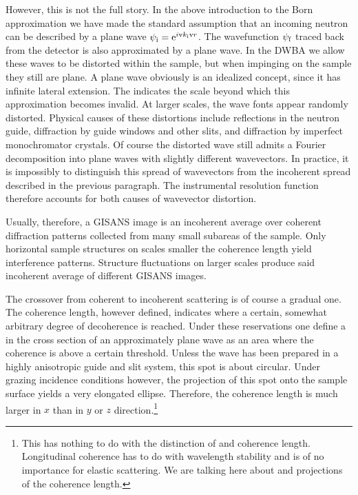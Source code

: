 However, this is not the full story.
In the above introduction to the Born approximation
we have made the standard assumption
that an incoming neutron can be described by a plane wave
$\psi_{\text{i}}=\text{e}^{i\text{v}{k}_{\text{i}}\text{v}{r}}$.
The wavefunction $\psi_{\text{f}}$ traced back from the detector is also
approximated by a plane wave.
In the DWBA we allow these waves to be distorted within the sample,
but when impinging on the sample they still are plane.
A plane wave obviously is an idealized concept,
since it has infinite lateral extension.
The  indicates the scale
beyond which this approximation becomes invalid.
At larger scales, the wave fonts appear randomly distorted.
Physical causes of these distortions include
reflections in the neutron guide,
diffraction by guide windows and other slits,
and diffraction by imperfect monochromator crystals.
Of course the distorted wave still admits a Fourier decomposition
into plane waves with slightly different wavevectors.
In practice, it is impossibly to distinguish this spread of wavevectors
from the incoherent spread described in the previous paragraph.
The instrumental resolution function therefore
accounts for both causes of wavevector distortion.
%

Usually, therefore, a GISANS image is an incoherent average
over coherent diffraction patterns collected from 
many small subareas of the sample.
Only horizontal sample structures on scales smaller the coherence length
yield interference patterns.
Structure fluctuations on larger scales
produce said incoherent average of different GISANS images.

The crossover from coherent to incoherent scattering is of course
a gradual one.
The coherence length, however defined,
indicates where a certain, somewhat arbitrary degree
of decoherence is reached.
Under these reservations
one define a 
in the cross section of an approximately plane wave
as an area where the coherence is above a certain threshold.
Unless the wave has been prepared in a highly anisotropic guide and slit system,
this spot is about circular.
Under grazing incidence conditions however,
the projection of this spot onto the sample surface
yields a very elongated ellipse.
Therefore, the coherence length is much larger in $x$ than
in $y$ or $z$ direction.\footnote
{This has nothing to do with the distinction of
   and  coherence length.
  Longitudinal coherence has to do with wavelength stability
  and is of no importance for elastic scattering.
  We are talking here about  and 
  projections of the  coherence length.}

